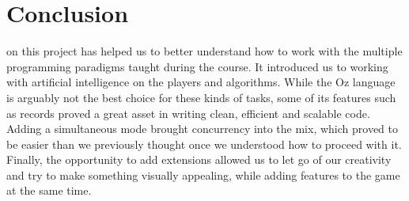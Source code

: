 \documentclass[12pt,journal]{IEEEtran}
\begin{document}
\section{Conclusion}
 on this project has helped us to better understand how to work with the multiple programming paradigms taught during the course.
It introduced us to working with artificial intelligence on the players and algorithms.
While the Oz language is arguably not the best choice for these kinds of tasks, some of its features such as records proved a great asset in writing clean, efficient and scalable code.
Adding a simultaneous mode brought concurrency into the mix, which proved to be easier than we previously thought once we understood how to proceed with it.
Finally, the opportunity to add extensions allowed us to let go of our creativity and try to make something visually appealing, while adding features to the game at the same time.
\end{document}
